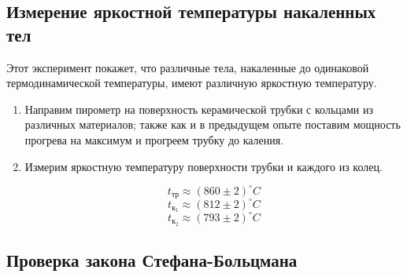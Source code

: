 \documentclass[a4paper]{article}
\begin{document}
\subsection{Измерение яркостной температуры накаленных тел}


Этот эксперимент покажет, что различные тела, накаленные до одинаковой термодинамической температуры,
имеют различную яркостную температуру.\par 

\begin{enumerate}
    \item Направим пирометр на поверхность керамической трубки с кольцами из различных материалов;
    также как и в предыдущем опыте поставим мощность прогрева на максимум и прогреем трубку до каления.

    \item Измерим яркостную температуру поверхности трубки и каждого из колец.
    
    $$t_{тр} \approx (860 \pm 2)^{\circ} C$$
    $$t_{к_1} \approx (812 \pm 2)^{\circ} C$$
    $$t_{к_2} \approx (793 \pm 2)^{\circ} C$$

\end{enumerate}



\subsection{Проверка закона Стефана-Больцмана}
\end{document}
